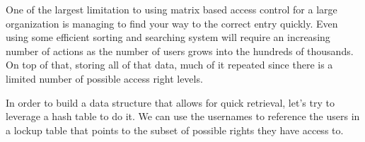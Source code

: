 




One of the largest limitation to using matrix based access control for a large organization is managing to find your way to the correct entry quickly. Even using some efficient sorting and searching system will require an increasing number of actions as the number of users grows into the hundreds of thousands. On top of that, storing all of that data, much of it repeated since there is a limited number of possible access right levels.

In order to build a data structure that allows for quick retrieval, let's try to leverage a hash table to do it. We can use the usernames to reference the users in a lockup table that points to the subset of possible rights they have access to. \\

